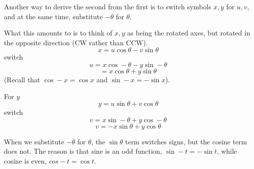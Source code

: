 \documentclass[11pt, oneside]{article}
\begin{document}
Another way to derive the second from the first is to switch symbols $x,y$ for $u,v$, and at the same time, substitute $-\theta$ for $\theta$.  

What this amounts to is to think of $x,y$ as being the rotated axes, but rotated in the opposite direction (CW rather than CCW).
\[ x = u \cos \theta - v \sin \theta \]
switch
\[ u = x \cos -\theta - y \sin -\theta \]
\[ = x \cos \theta + y \sin \theta \]
(Recall that $\cos - x = \cos x$ and $\sin - x = - \sin x$).

For $y$
\[ y = u \sin \theta + v \cos \theta \]
switch
\[ v = x \sin -\theta + y \cos -\theta \]
\[ v = -x \sin \theta + y \cos \theta \]

When we substitute $-\theta$ for $\theta$, the $\sin \theta$ term switches signs, but the cosine term does not.  The reason is that sine is an odd function, $\sin -t = - \sin t$, while cosine is even, $cos -t = \cos t$.
\end{document}

